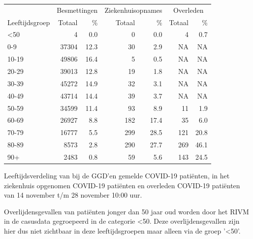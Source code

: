 \documentclass[
  english,
  man,floatsintext]{apa6}
\begin{document}
\begin{table}
\centering\begingroup\fontsize{11}{13}\selectfont

\begin{threeparttable}
\begin{tabular}{lrrrrrr}
\toprule
\multicolumn{1}{c}{ } & \multicolumn{2}{c}{Besmettingen} & \multicolumn{2}{c}{Ziekenhuisopnames} & \multicolumn{2}{c}{Overleden} \\
\cmidrule(l{3pt}r{3pt}){2-3} \cmidrule(l{3pt}r{3pt}){4-5} \cmidrule(l{3pt}r{3pt}){6-7}
Leeftijdsgroep & Totaal & \% & Totaal & \% & Totaal & \%\\
\midrule
<50 & 4 & 0.0 & 0 & 0.0 & 4 & 0.7\\
0-9 & 37304 & 12.3 & 30 & 2.9 & NA & NA\\
10-19 & 49806 & 16.4 & 5 & 0.5 & NA & NA\\
20-29 & 39013 & 12.8 & 19 & 1.8 & NA & NA\\
30-39 & 45272 & 14.9 & 32 & 3.1 & NA & NA\\
40-49 & 43714 & 14.4 & 39 & 3.7 & NA & NA\\
50-59 & 34599 & 11.4 & 93 & 8.9 & 11 & 1.9\\
60-69 & 26927 & 8.8 & 182 & 17.4 & 35 & 6.0\\
70-79 & 16777 & 5.5 & 299 & 28.5 & 121 & 20.8\\
80-89 & 8573 & 2.8 & 290 & 27.7 & 269 & 46.1\\
90+ & 2483 & 0.8 & 59 & 5.6 & 143 & 24.5\\
\bottomrule
\end{tabular}
\begin{tablenotes}
\item[1] Leeftijdsverdeling van bij de GGD’en gemelde COVID-19 patiënten, in het ziekenhuis opgenomen COVID-19 patiënten en overleden COVID-19 patiënten van 14 november t/m 28 november 10:00 uur.
\item[2] Overlijdensgevallen van patiënten jonger dan 50 jaar oud worden door het RIVM in de casusdata gegroepeerd in de categorie <50. Deze overlijdensgevallen zijn hier dus niet zichtbaar in deze leeftijdsgroepen maar alleen via de groep '<50'.
\end{tablenotes}
\end{threeparttable}
\endgroup{}
\end{table}

\newpage
\end{document}
